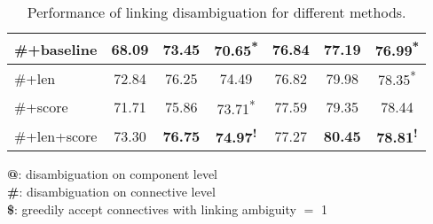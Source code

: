 \begin{table}[ht]
\begin{tabular}{|l|c|c|c|c|c|c|}
\hhline{|=|=|=|=|=|=|=|}

\#+baseline    &     68.09     &     73.45  &     70.65\textsuperscript{*} &     76.84     &     77.19  &     76.99\textsuperscript{*} \\ \hline
\#+len         &     72.84     &     76.25  &     74.49\textsuperscript{ } &     76.82     &     79.98  &     78.35\textsuperscript{*} \\ \hline
\#+score       &     71.71     &     75.86  &     73.71\textsuperscript{*} &     77.59     &     79.35  &     78.44\textsuperscript{ } \\ \hline
\#+len+score   &     73.30     & \bf 76.75  & \bf 74.97\textsuperscript{!} &     77.27     & \bf 80.45  & \bf 78.81\textsuperscript{!} \\ \hline

\end{tabular}
\begin{flushleft}
\small
\textbf{@}: disambiguation on component level \\
\textbf{\#}: disambiguation on connective level \\
\textbf{\$}: greedily accept connectives with linking ambiguity $=$ 1
\end{flushleft}
\caption{\label{t:linking-methods} Performance of linking
disambiguation for different methods. }
\end{table}

